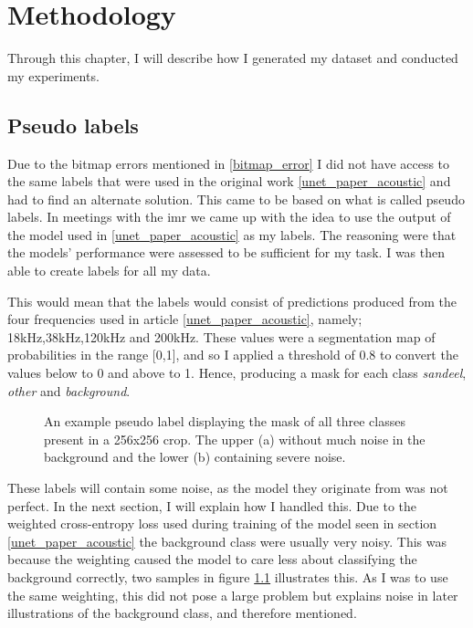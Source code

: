 \chapter{Methodology}
    Through this chapter, I will describe how I generated my dataset and conducted my experiments. 

    \section{Pseudo labels} \label{Pseudo label}
        Due to the bitmap errors mentioned in \ref{bitmap_error} I did not have access to the same labels that were used in the original work \ref{unet_paper_acoustic} and had to find an alternate solution. This came to be based on what is called pseudo labels. In meetings with the \gls{imr} we came up with the idea to use the output of the model used in \ref{unet_paper_acoustic} as my labels. The reasoning were that the models' performance were assessed to be sufficient for my task. I was then able to create labels for all my data.
        
        This would mean that the labels would consist of predictions produced from the four frequencies used in article \ref{unet_paper_acoustic}, namely; 18kHz,38kHz,120kHz and 200kHz. These values were a segmentation map of probabilities in the range [0,1], and so I applied a threshold of 0.8 to convert the values below to 0 and above to 1. Hence, producing a mask for each class \textit{sandeel}, \textit{other} and \textit{background}. 
        
        \clearpage
        \begin{figure}[H]
        \centering
        
        
        
        
        \caption{An example pseudo label displaying the mask of all three classes present in a 256x256 crop. The upper (a) without much noise in the background and the lower (b) containing severe noise.}
        \label{data sample fig}
        
        \end{figure}
        These labels will contain some noise, as the model they originate from was not perfect. In the next section, I will explain how I handled this. Due to the weighted cross-entropy loss used during training of the model seen in section \ref{unet_paper_acoustic} the background class were usually very noisy. This was because the weighting caused the model to care less about classifying the background correctly, two samples in figure \ref{data sample fig} illustrates this. As I was to use the same weighting, this did not pose a large problem but explains noise in later illustrations of the background class, and therefore mentioned.

